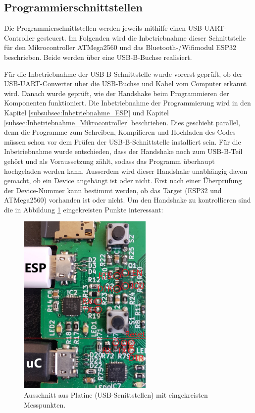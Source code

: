 \newpage
\subsection{Programmierschnittstellen}
\label{sec:Inbetriebnahme_Programmierschnittstellen}

Die Programmierschnittstellen werden jeweils mithilfe einen USB-UART-Controller gesteuert. Im Folgenden wird die Inbetriebnahme dieser Schnittstelle für den Mikrocontroller ATMega2560 und das Bluetooth-/Wifimodul ESP32 beschrieben. Beide werden über eine USB-B-Buchse realisiert.

Für die Inbetriebnahme der USB-B-Schnittstelle wurde vorerst geprüft, ob der USB-UART-Converter über die USB-Buchse und Kabel vom Computer erkannt wird. Danach wurde geprüft, wie der Handshake beim Programmieren der Komponenten funktioniert. Die Inbetriebnahme der Programmierung wird in den Kapitel \ref{subsubsec:Inbetriebnahme_ESP} und Kapitel \ref{subsec:Inbetriebnahme_Mikrocontroller} beschrieben. Dies geschieht parallel, denn die Programme zum Schreiben, Kompilieren und Hochladen des Codes müssen schon vor dem Prüfen der USB-B-Schnittstelle installiert sein. Für die Inbetriebnahme wurde entschieden, dass der Handshake noch zum USB-B-Teil gehört und als Voraussetzung zählt, sodass das Programm überhaupt hochgeladen werden kann. Ausserdem wird dieser Handshake unabhängig davon gemacht, ob ein Device angehängt ist oder nicht. Erst nach einer Überprüfung der Device-Nummer kann bestimmt werden, ob das Target (ESP32 und ATMega2560) vorhanden ist oder nicht. Um den Handshake zu kontrollieren sind die in Abbildung \ref{fig:USB_B_Print} eingekreisten Punkte interessant:


\begin{figure}[h!]
\center
\includegraphics[width = 0.58\textwidth]{graphics/USB_B_Print}
\caption{Ausschnitt aus Platine (USB-Scnittstellen) mit eingekreisten Messpunkten.}
\label{fig:USB_B_Print}
\end{figure}

